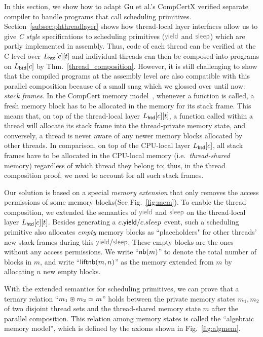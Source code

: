 In this section, we show how to adapt Gu et al.'s CompCertX verified
separate compiler \cite[\S 6]{dscal15} to handle programs that call scheduling primitives.
Section~\ref{subsec:phthreadlayer} shows how thread-local layer interfaces  allow us to
give \emph{C style} specifications to scheduling primitives
($\commc{yield}$ and $\commc{sleep}$) which are partly implemented in assembly.
Thus, code of each thread can be verified at the C level over $L_{\mathsf{\textcolor{black}{htd}}}[c][t]$ and 
individual threads can then be composed
into programs on $L_{\mathsf{\textcolor{black}{btd}}}[c]$ by Thm.~\ref{thread_composition}.
However, it is still challenging to show that the compiled programs at the assembly level
are also compatible with this parallel composition
because
of a small snag which we glossed over until now: \emph{stack frames}.
In the CompCert memory model~\cite{leroy08},
whenever
a function is called, a fresh memory block has to be allocated in the
 memory for its stack frame. This means that, on top of the thread-local layer $L_{\mathsf{\textcolor{black}{htd}}}[c][t]$, a function called within a thread will allocate its stack frame
into the thread-private memory state, and conversely, a thread is
never aware of any newer memory blocks allocated by other
threads. In comparison, on top of the CPU-local layer $L_{\mathsf{\textcolor{black}{btd}}}[c]$, all stack frames have to be allocated
in the CPU-local memory (i.e.\, \emph{thread-shared} memory) regardless of which thread they belong to;
thus, in the thread composition proof, we need to account
for all such stack frames.

Our solution is based on a special \emph{memory
extension} \cite[\S 5.2]{leroy08} that only removes the access permissions of some memory 
blocks(See Fig.~\ref{fig:mem}). 
To enable the  thread composition, we extended the semantics of $\commc{yield}$ and $\commc{sleep}$ on the thread-local layer $L_{\mathsf{\textcolor{black}{htd}}}[c][t]$. Besides generating a $c.\mathsf{yield}/c.sleep$ event, such a scheduling primitive also allocates  \emph{empty} memory blocks 
as ``placeholders" for other threads' new stack frames during this $\commc{yield}/\commc{sleep}$.
These empty blocks are the ones without any access permissions.
We write ``$\mathsf{nb}({m})$'' to denote the total number
of blocks in $m$, and write ``$\mathsf{liftnb}({m}, {n})$'' as the memory   extended
from $m$ by allocating $n$ new
empty blocks. 

With the extended semantics for scheduling primitives, we can prove
that a ternary relation ``${m_1} \circledast {m_2} \simeq {m}$'' holds between the
private memory states $m_1, m_2$ of two disjoint thread sets and the
thread-shared memory state $m$ after the parallel composition. This relation among memory states is called the ``algebraic memory model'', which is defined by the axioms shown in Fig.~\ref{fig:algmem}.
 
